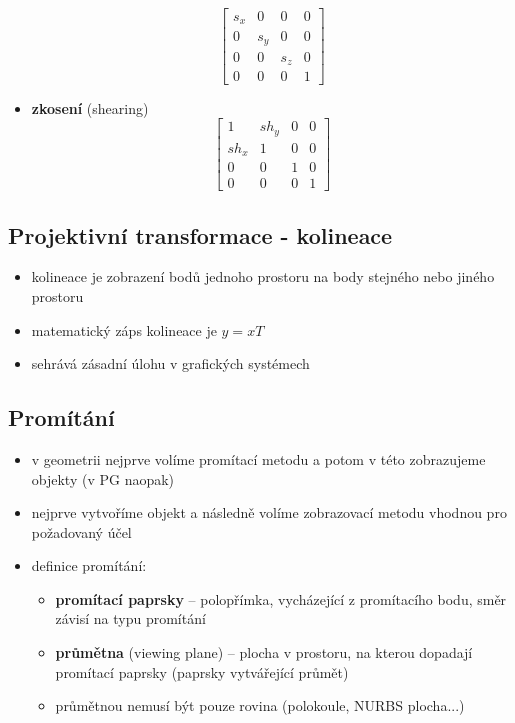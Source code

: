 \begin{itemize}
		\begin{equation*}
			 \begin{bmatrix}
			     s_x & 0 & 0 & 0     	\\[0.3em]
    			 0 & s_y & 0 & 0      	\\[0.3em]
    			 0 & 0 & s_z & 0      	\\[0.3em]
     			 0 & 0 & 0 & 1      
			  \end{bmatrix}
		\end{equation*}
	\item \textbf{zkosení} (shearing)
		\begin{equation*}
			 \begin{bmatrix}
			     1 & sh_y & 0 & 0       \\[0.3em]
    			 sh_x & 1 & 0 & 0       \\[0.3em]
     			 0 & 0 & 1 & 0       	\\[0.3em]
     			 0 & 0 & 0 & 1       
			  \end{bmatrix}
		\end{equation*}
\end{itemize}

\subsection{Projektivní transformace - kolineace}
\begin{itemize}
	\item kolineace je zobrazení bodů jednoho prostoru na body stejného nebo jiného prostoru
	\item matematický záps kolineace je $y = xT$
	\item sehrává zásadní úlohu v grafických systémech
\end{itemize}

\subsection{Promítání}
\begin{itemize}
	\item v geometrii nejprve volíme promítací metodu a potom v této zobrazujeme objekty (v PG naopak)
	\item nejprve vytvoříme objekt a následně volíme zobrazovací metodu vhodnou pro požadovaný účel
	\item definice promítání:
	\begin{itemize}
		\item \textbf{promítací paprsky} -- polopřímka, vycházející z promítacího bodu, směr závisí na typu promítání
		\item \textbf{průmětna} (viewing plane) -- plocha v prostoru, na kterou dopadají promítací paprsky (paprsky vytvářející průmět)
		\item průmětnou nemusí být pouze rovina (polokoule, NURBS plocha...)
	\end{itemize}
\end{itemize}

